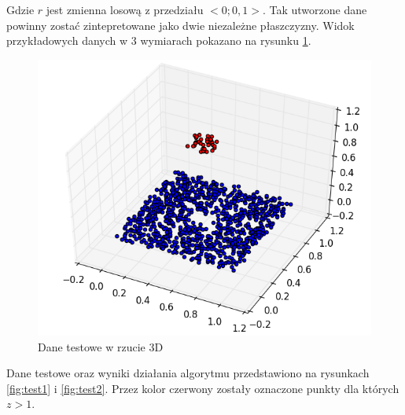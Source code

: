 Gdzie $r$ jest zmienna losową z przedziału $<0;0,1>$. Tak utworzone dane powinny zostać zintepretowane jako
dwie niezależne płaszczyzny. Widok przykładowych danych w 3 wymiarach pokazano na rysunku \ref{fig:dane_zerowe}.

\begin{figure}[h!]
    \centering
    \includegraphics[width=0.6\linewidth]{img/test0.png}
    \caption{Dane testowe w rzucie 3D}
    \label{fig:dane_zerowe}
\end{figure}

Dane testowe oraz wyniki działania algorytmu przedstawiono na rysunkach \ref{fig:test1} i \ref{fig:test2}.
Przez kolor czerwony zostały oznaczone punkty dla których $z > 1$.

